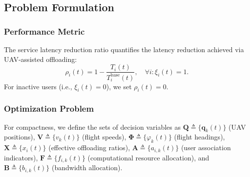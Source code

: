 \documentclass[journal]{IEEEtran}
\begin{document}
\subsection{Problem Formulation}
\subsubsection{Performance Metric}

The service latency reduction ratio quantifies the latency reduction achieved via UAV-assisted offloading:
\begin{equation}\label{eq:slrr}
\rho_i(t) = 1 - \frac{T_i(t)}{T_i^{\mathrm{base}}(t)}, \quad \forall i: \xi_i(t)=1.
\end{equation}
For inactive users (i.e., $\xi_i(t) = 0$), we set $\rho_i(t) = 0$.

\subsubsection{Optimization Problem}

For compactness, we define the sets of decision variables as
$\bm{Q}\triangleq\{\bm q_k(t)\}$ (UAV positions),
$\bm{V}\triangleq\{v_k(t)\}$ (flight speeds),
$\bm{\Phi}\triangleq\{\varphi_k(t)\}$ (flight headings),
$\bm{X}\triangleq\{x_i(t)\}$ (effective offloading ratios),
$\bm{A}\triangleq\{a_{i,k}(t)\}$ (user association indicators),
$\bm{F}\triangleq\{f_{i,k}(t)\}$ (computational resource allocation), and
$\bm{B}\triangleq\{b_{i,k}(t)\}$ (bandwidth allocation).
\end{document}
